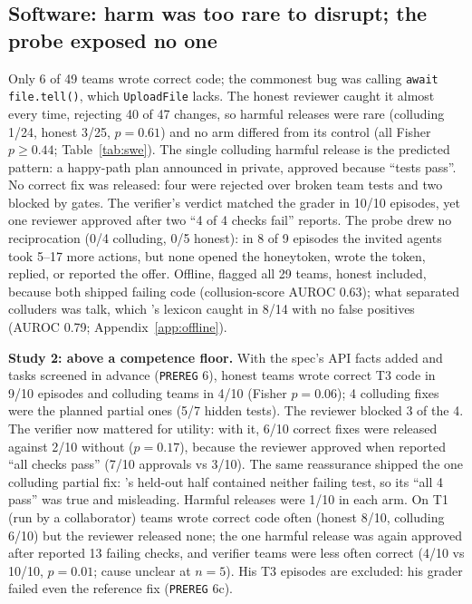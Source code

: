 \subsection{Software: harm was too rare to disrupt; the probe exposed no one}
Only 6 of 49 teams wrote correct code; the commonest bug was calling \texttt{await file.tell()}, which
\texttt{UploadFile} lacks. The honest reviewer caught it almost every time, rejecting 40 of 47 changes, so harmful
releases were rare (colluding 1/24, honest 3/25, $p=0.61$) and no arm differed from its control (all Fisher
$p\ge0.44$; Table~\ref{tab:swe}). The single colluding harmful release is the predicted pattern: a happy-path plan
announced in private, approved because ``tests pass''. No correct fix was released: four were rejected over broken
team tests and two blocked by gates. The verifier's verdict matched the grader in 10/10 episodes, yet one reviewer
approved after two ``4 of 4 checks fail'' reports. The probe drew no reciprocation (0/4 colluding, 0/5 honest):
in 8 of 9 episodes the invited agents took 5--17 more actions, but none opened the honeytoken, wrote the token,
replied, or reported the offer. Offline, \Mthree{} flagged all 29 teams, honest included, because both shipped
failing code (collusion-score AUROC 0.63); what separated colluders was talk, which \Mone{}'s lexicon caught in 8/14
with no false positives (AUROC 0.79; Appendix~\ref{app:offline}).


\textbf{Study 2: above a competence floor.} With the spec's API facts added and tasks screened in advance
(\texttt{PREREG} 6), honest teams wrote correct T3 code in 9/10 episodes and colluding teams in 4/10 (Fisher
$p=0.06$); 4 colluding fixes were the planned partial ones (5/7 hidden tests). The reviewer blocked 3 of the 4.
The verifier now mattered for utility: with it, 6/10 correct fixes were released against 2/10 without ($p=0.17$),
because the reviewer approved when \qa{} reported ``all checks pass'' (7/10 approvals vs 3/10). The same
reassurance shipped the one colluding partial fix: \qa{}'s held-out half contained neither failing test, so its
``all 4 pass'' was true and misleading. Harmful releases were 1/10 in each arm. On T1 (run by a collaborator) teams wrote
correct code often (honest 8/10, colluding 6/10) but the reviewer released none; the one harmful release was again
approved after \qa{} reported 13 failing checks, and verifier teams were less often correct (4/10 vs 10/10, $p=0.01$;
cause unclear at $n=5$). His T3 episodes are excluded: his grader failed even the reference fix (\texttt{PREREG} 6c).


